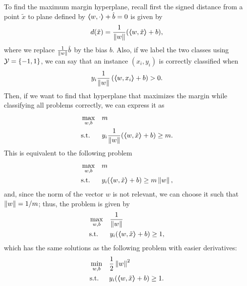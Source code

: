 To find the maximum margin hyperplane, recall first the signed distance from a point $\tilde{x}$ to plane defined by $\bm{\left\langle} w, \cdot \bm{\right\rangle} + \hat{b} = 0$ is given by 
\begin{equation}
    \nonumber
    d(\tilde{x}) = \frac{1}{\left\lVert w\right\rVert} (\bm{\left\langle} w, \tilde{x} \bm{\right\rangle} + b) ,
\end{equation}
where we replace $\frac{1}{\left\lVert w\right\rVert} \hat{b}$ by the bias $b$.
Also, if we label the two classes using $\mathcal{Y} = \left\{-1, 1\right\}$, we can say that an instance $(x_i, y_i)$ is correctly classified when $$y_i \frac{1}{\left\lVert w\right\rVert} \left(\bm{\left\langle} w, x_i \bm{\right\rangle} + b \right) > 0 .$$
Then, if we want to find that hyperplane that maximizes the margin while classifying all problems correctly, we can express it as
\begin{equation}\nonumber
    \begin{aligned}
        &\max_{w, b} & & m \\
        & \text{s.t.} & & y_i \frac{1}{\left\lVert w\right\rVert} (\bm{\left\langle} w, \tilde{x} \bm{\right\rangle} + b) \geq m .         
    \end{aligned}  
\end{equation}
This is equivalent to the following problem 
\begin{equation}\nonumber
    \begin{aligned}
        &\max_{w, b} & & m \\
        & \text{s.t.} & & y_i (\bm{\left\langle} w, \tilde{x} \bm{\right\rangle} + b) \geq m \left\lVert w\right\rVert ,       
    \end{aligned}  
\end{equation}
and, since the norm of the vector $w$ is not relevant, we can choose it such that $\left\lVert w\right\rVert = 1 / m$; thus, the problem is given by
\begin{equation}\nonumber
    \begin{aligned}
        &\max_{w, b} & & \frac{1}{\left\lVert w\right\rVert} \\
        & \text{s.t.} & & y_i (\bm{\left\langle} w, \tilde{x} \bm{\right\rangle} + b) \geq 1 ,       
    \end{aligned}  
\end{equation}
which has the same solutions as the following problem with easier derivatives:
\begin{equation}
    \label{eq:separable_primal}
    \begin{aligned}
        &\min_{w, b} & & \frac{1}{2} \norm{w}^2 \\
        & \text{s.t.} & & y_i (\dotp{w}{\tilde{x}} + b) \geq 1 .       
    \end{aligned}  
\end{equation}
